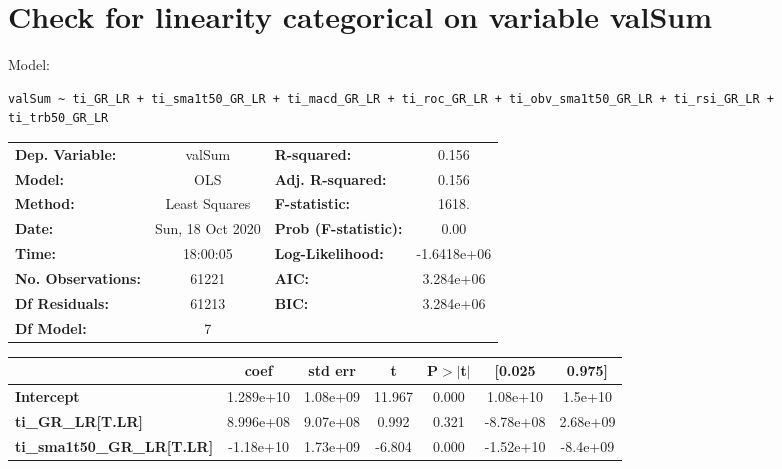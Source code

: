 \section{Check for linearity categorical on variable valSum}

Model: \begin{verbatim}valSum ~ ti_GR_LR + ti_sma1t50_GR_LR + ti_macd_GR_LR + ti_roc_GR_LR + ti_obv_sma1t50_GR_LR + ti_rsi_GR_LR + ti_trb50_GR_LR\end{verbatim}

\begin{center}
\begin{tabular}{lclc}
\toprule
\textbf{Dep. Variable:}                 &      valSum      & \textbf{  R-squared:         } &      0.156   \\
\textbf{Model:}                         &       OLS        & \textbf{  Adj. R-squared:    } &      0.156   \\
\textbf{Method:}                        &  Least Squares   & \textbf{  F-statistic:       } &      1618.   \\
\textbf{Date:}                          & Sun, 18 Oct 2020 & \textbf{  Prob (F-statistic):} &      0.00    \\
\textbf{Time:}                          &     18:00:05     & \textbf{  Log-Likelihood:    } & -1.6418e+06  \\
\textbf{No. Observations:}              &       61221      & \textbf{  AIC:               } &  3.284e+06   \\
\textbf{Df Residuals:}                  &       61213      & \textbf{  BIC:               } &  3.284e+06   \\
\textbf{Df Model:}                      &           7      & \textbf{                     } &              \\
\bottomrule
\end{tabular}
\begin{tabular}{lcccccc}
                                        & \textbf{coef} & \textbf{std err} & \textbf{t} & \textbf{P$> |$t$|$} & \textbf{[0.025} & \textbf{0.975]}  \\
\midrule
\textbf{Intercept}                      &    1.289e+10  &     1.08e+09     &    11.967  &         0.000        &     1.08e+10    &      1.5e+10     \\
\textbf{ti\_GR\_LR[T.LR]}               &    8.996e+08  &     9.07e+08     &     0.992  &         0.321        &    -8.78e+08    &     2.68e+09     \\
\textbf{ti\_sma1t50\_GR\_LR[T.LR]}      &    -1.18e+10  &     1.73e+09     &    -6.804  &         0.000        &    -1.52e+10    &     -8.4e+09     \\

\end{tabular}
\end{center}
